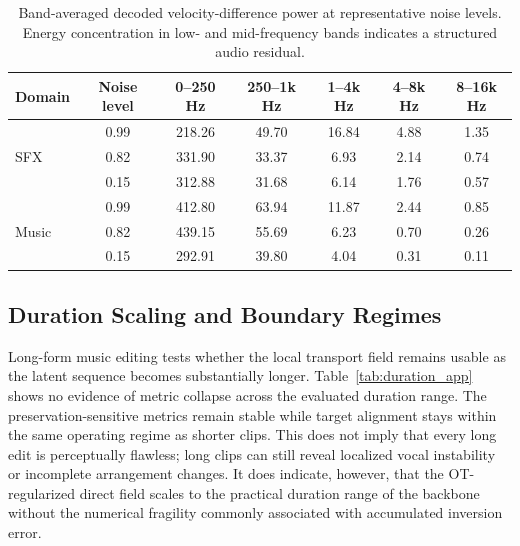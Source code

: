 \begin{table}[htpb]
    \centering
    \small
    \setlength{\tabcolsep}{4.5pt}
    \begin{tabular}{lcccccc}
        \toprule
        \textbf{Domain} & \textbf{Noise level} & \textbf{0--250 Hz} & \textbf{250--1k Hz} & \textbf{1--4k Hz} & \textbf{4--8k Hz} & \textbf{8--16k Hz} \\
        \midrule
        \multirow{3}{*}{SFX} & 0.99 & 218.26 & 49.70 & 16.84 & 4.88 & 1.35 \\
        & 0.82 & 331.90 & 33.37 & 6.93 & 2.14 & 0.74 \\
        & 0.15 & 312.88 & 31.68 & 6.14 & 1.76 & 0.57 \\
        \midrule
        \multirow{3}{*}{Music} & 0.99 & 412.80 & 63.94 & 11.87 & 2.44 & 0.85 \\
        & 0.82 & 439.15 & 55.69 & 6.23 & 0.70 & 0.26 \\
        & 0.15 & 292.91 & 39.80 & 4.04 & 0.31 & 0.11 \\
        \bottomrule
    \end{tabular}
    \caption{Band-averaged decoded velocity-difference power at representative noise levels. Energy concentration in low- and mid-frequency bands indicates a structured audio residual.}
    \label{tab:psd_band_app}
\end{table}

\subsection{Duration Scaling and Boundary Regimes}
\label{app:duration_limitations}

Long-form music editing tests whether the local transport field remains usable as the latent sequence becomes substantially longer.
Table~\ref{tab:duration_app} shows no evidence of metric collapse across the evaluated duration range.
The preservation-sensitive metrics remain stable while target alignment stays within the same operating regime as shorter clips.
This does not imply that every long edit is perceptually flawless; long clips can still reveal localized vocal instability or incomplete arrangement changes.
It does indicate, however, that the OT-regularized direct field scales to the practical duration range of the backbone without the numerical fragility commonly associated with accumulated inversion error.

